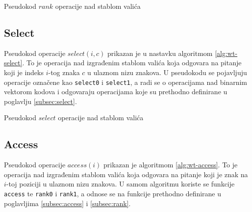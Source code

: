 \documentclass[times, utf8, seminar, numeric]{fer}
\begin{document}
\begin{algorithm}[H]
 \caption{Pseudokod $rank$ operacije nad stablom valića}
 \label{alg:wt-rank}
\end{algorithm}

\subsection{Select}
Pseudokod operacije $select(i, c)$ prikazan je u nastavku algoritmom \ref{alg:wt-select}. To je operacija nad izgrađenim stablom valića koja odgovara na pitanje koji je indeks $i$-tog znaka $c$ u ulaznom nizu znakova. U pseudokodu se pojavljuju operacije označene kao \texttt{select0} i \texttt{select1}, a radi se o operacijama nad binarnim vektorom kodova i odgovaraju operacijama koje su prethodno definirane u poglavlju \ref{subsec:select}.

\begin{algorithm}[H]
 \caption{Pseudokod $select$ operacije nad stablom valića}
 \label{alg:wt-select}
\end{algorithm}


\subsection{Access}
Pseudokod operacije $access(i)$ prikazan je algoritmom \ref{alg:wt-access}. To je operacija nad izgrađenim stablom valića koja odgovara na pitanje koji je znak na $i$-toj poziciji u ulaznom nizu znakova. U samom algoritmu koriste se funkcije \texttt{access} te \texttt{rank0} i \texttt{rank1}, a odnose se na funkcije prethodno definirane u poglavljima \ref{subsec:access} i \ref{subsec:rank}.
\end{document}
